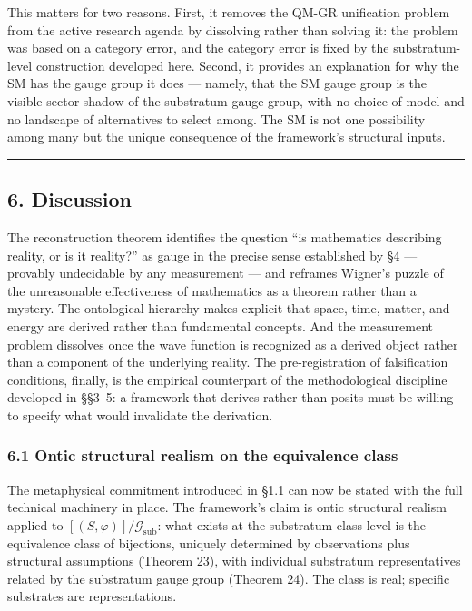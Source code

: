 \documentclass[
]{article}
\begin{document}
This matters for two reasons. First, it removes the QM-GR unification
problem from the active research agenda by dissolving rather than
solving it: the problem was based on a category error, and the category
error is fixed by the substratum-level construction developed here.
Second, it provides an explanation for why the SM has the gauge group it
does --- namely, that the SM gauge group is the visible-sector shadow of
the substratum gauge group, with no choice of model and no landscape of
alternatives to select among. The SM is not one possibility among many
but the unique consequence of the framework's structural inputs.

\begin{center}\rule{0.5\linewidth}{0.5pt}\end{center}

\hypertarget{discussion}{%
\subsection{6. Discussion}\label{discussion}}

The reconstruction theorem identifies the question ``is mathematics
describing reality, or is it reality?'' as gauge in the precise sense
established by §4 --- provably undecidable by any measurement --- and
reframes Wigner's puzzle of the unreasonable effectiveness of
mathematics as a theorem rather than a mystery. The ontological
hierarchy makes explicit that space, time, matter, and energy are
derived rather than fundamental concepts. And the measurement problem
dissolves once the wave function is recognized as a derived object
rather than a component of the underlying reality. The pre-registration
of falsification conditions, finally, is the empirical counterpart of
the methodological discipline developed in §§3--5: a framework that
derives rather than posits must be willing to specify what would
invalidate the derivation.

\hypertarget{ontic-structural-realism-on-the-equivalence-class}{%
\subsubsection{6.1 Ontic structural realism on the equivalence
class}\label{ontic-structural-realism-on-the-equivalence-class}}

The metaphysical commitment introduced in §1.1 can now be stated with
the full technical machinery in place. The framework's claim is ontic
structural realism applied to
\([(S, \varphi)] / \mathcal{G}_{\text{sub}}\): what exists at the
substratum-class level is the equivalence class of bijections, uniquely
determined by observations plus structural assumptions (Theorem 23),
with individual substratum representatives related by the substratum
gauge group (Theorem 24). The class is real; specific substrates are
representations.
\end{document}
